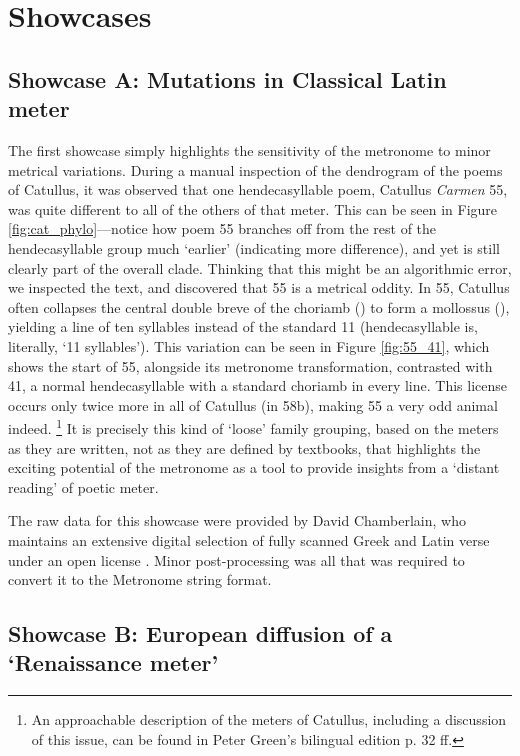 \documentclass[
    hf
]{ceurart}
\begin{document}
\section{Showcases}

\subsection*{Showcase A: Mutations in Classical Latin meter}

The first showcase simply highlights the sensitivity of the metronome to minor metrical variations. During a manual inspection of the dendrogram of the poems of Catullus, it was observed that one hendecasyllable poem, Catullus \textit{Carmen} 55, was quite different to all of the others of that meter. This can be seen in Figure \ref{fig:cat_phylo}---notice how poem 55 branches off from the rest of the hendecasyllable group much `earlier' (indicating more difference), and yet is still clearly part of the overall clade. Thinking that this might be an algorithmic error, we inspected the text, and discovered that 55 is a metrical oddity. In 55, Catullus often collapses the central double breve of the choriamb () to form a mollossus (\metricsymbols{_ _ _}), yielding a line of ten syllables instead of the standard 11 (hendecasyllable is, literally, `11 syllables'). This variation can be seen in Figure \ref{fig:55_41}, which shows the start of 55, alongside its metronome transformation, contrasted with 41, a normal hendecasyllable with a standard choriamb in every line. This license occurs only twice more in all of Catullus (in 58b), making 55 a very odd animal indeed.%
%
\footnote{An approachable description of the meters of Catullus, including a discussion of this issue, can be found in Peter Green’s bilingual edition  \cite{catullus_poems_2005} p. 32 ff.}
%
It is precisely this kind of `loose' family grouping, based on the meters as they are written, not as they are defined by textbooks, that highlights the exciting potential of the metronome as a tool to provide insights from a `distant reading' of poetic meter.

The raw data for this showcase were provided by David Chamberlain, who maintains an extensive digital selection of fully scanned Greek and Latin verse under an open license \cite{hypotactic}. Minor post-processing was all that was required to convert it to the Metronome string format.

\subsection*{Showcase B: European diffusion of a `Renaissance meter'}
\end{document}
